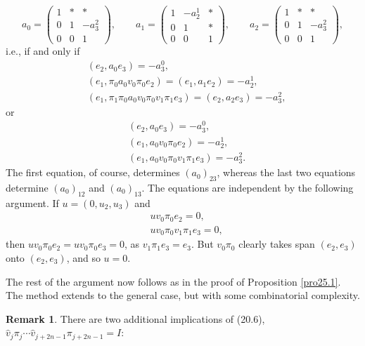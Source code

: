 \documentclass{surv-l}
\theoremstyle{plain}
\theoremstyle{definition}
\newtheorem{remark}[theorem]{Remark}
\numberwithin{equation}{chapter}
\begin{document}
\begin{equation*}
a_{0}=\left(\begin{array}{ccc}
1 & * & *\\
0 & 1 & -a_{3}^{2}\\
0 & 0 & 1
\end{array}\right),\qquad  {a}_{1}=\left(\begin{array}{ccc}
1 & -a_{2}^{1} & *\\
0 & 1 & *\\
0 & 0 & 1
\end{array}\right),\qquad  a_{2}=\left(\begin{array}{ccc}
1 & * & *\\
0 & 1 & -a_{3}^{2}\\
0 & 0 & 1
\end{array}\right),
\end{equation*}
i.e., if and only if
\begin{align*}
&(e_{2},a_{0}e_{3}) =-a_{3}^{0},\\
& (e_{1}, \pi_{0}a_{0}v_{0}\pi_{0}e_{2})=(e_{1}, a_{1}e_{2})=-a_{2}^{1},\\
&(e_{1}, \pi_{1}\pi_{0}a_{0}v_{0}\pi_{0}v_{1}\pi_{1}e_{3})=(e_{2},a_{2}e_{3})=-a_{3}^{2},
\end{align*}
or
\begin{align*}
&(e_{2}, a_{0}e_{3})=-a_{3}^{0},\\
&(e_{1}, a_{0}v_{0}\pi_{0}e_{2})=-a_{2}^{1},\\
&(e_{1}, a_{0}v_{0}\pi_{0}v_{1}\pi_{1}e_{3})=-a_{3}^{2}.
\end{align*}
The first equation, of course, determines $(a_{0})_{23}$, whereas the last two equations determine $(a_{0})_{12}$ and $(a_{0})_{13}$. The equations are independent by the following argument. If $u=(0,u_{2},u_{3})$ and
\begin{align*}
&uv_{0}\pi_{0}e_{2}=0,\\
&uv_{0}\pi_{0}v_{1}\pi_{1}e_{3}=0,
\end{align*}
then $uv_{0}\pi_{0}e_{2}=uv_{0}\pi_{0}e_{3}=0$, as $v_{1}\pi_{1}e_{3}=e_{3}$. But $v_{0}\pi_{0}$ clearly takes span $(e_{2},e_{3})$ onto $(e_{2}, e_{3})$, and so $u=0$.

The rest of the argument now follows as in the proof of Proposition \ref{pro25.1}. The method extends to the general case, but with some combinatorial complexity.

\begin{remark}\label{rem25.15}
There are two additional implications of (20.6), $\hat{v}_{j}\pi_{j}\cdots\hat{v}_{j+2n-1}\pi_{j+2n-1}=I$:
\end{remark}
\end{document}
